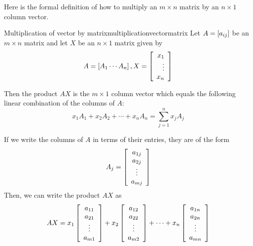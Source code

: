 Here is the formal definition of how to multiply an $m\times
n $ matrix by an $ n\times 1 $ column vector.

\begin{definition}{Multiplication of vector by matrix}{multiplicationvectormatrix}
Let $A=\left[ a_{ij} \right]$ be an $m\times n$ matrix and let $X$
be an $n\times 1$ matrix given by 
\begin{equation*}
A=\left[ A_{1} \cdots A_{n}\right],  X = \left[
\begin{array}{r}
x_{1} \\
\vdots \\
x_{n}
\end{array}
\right] 
\end{equation*}

Then the product $AX$ is the $m\times 1$ column
vector
which equals the following
linear combination of the columns of $A$:
\begin{equation*}
x_{1}A_{1}+x_{2}A_{2}+\cdots +x_{n}A_{n} = 
\sum_{j=1}^{n}x_{j}A_{j}  
\end{equation*}
\end{definition}

If we write the columns of $A$ in terms of their entries, they are of the form
\begin{equation*}
A_{j}  =
\left[
\begin{array}{c}
a_{1j} \\
a_{2j} \\
\vdots \\
a_{mj}
\end{array}
\right] 
\end{equation*}
Then, we can write the product $AX$ as
\begin{equation*}
AX = 
x_{1}\left[
\begin{array}{c}
a_{11} \\
a_{21} \\
\vdots \\
a_{m1}
\end{array}
\right] + x_{2}\left[
\begin{array}{c}
a_{12} \\
a_{22} \\
\vdots \\
a_{m2}
\end{array}
\right] +\cdots + x_{n}\left[
\begin{array}{c}
a_{1n} \\
a_{2n} \\
\vdots \\
a_{mn}
\end{array}
\right] 
\end{equation*}

